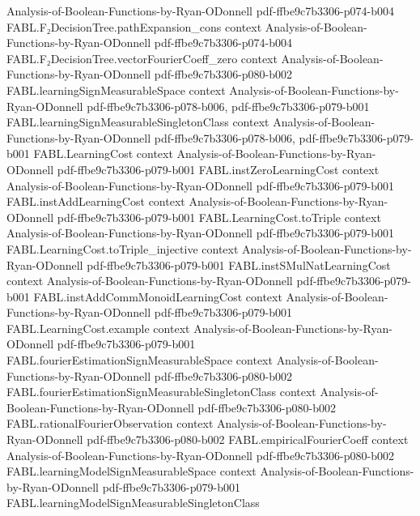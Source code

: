 \begin{theorem}
  {Analysis-of-Boolean-Functions-by-Ryan-ODonnell}
  {pdf-ffbe9c7b3306-p074-b004}
\proofstep
  {FABL.F₂DecisionTree.pathExpansion_cons}
  {context}
  {Analysis-of-Boolean-Functions-by-Ryan-ODonnell}
  {pdf-ffbe9c7b3306-p074-b004}
\proofstep
  {FABL.F₂DecisionTree.vectorFourierCoeff_zero}
  {context}
  {Analysis-of-Boolean-Functions-by-Ryan-ODonnell}
  {pdf-ffbe9c7b3306-p080-b002}
\proofstep
  {FABL.learningSignMeasurableSpace}
  {context}
  {Analysis-of-Boolean-Functions-by-Ryan-ODonnell}
  {pdf-ffbe9c7b3306-p078-b006,
    pdf-ffbe9c7b3306-p079-b001}
\proofstep
  {FABL.learningSignMeasurableSingletonClass}
  {context}
  {Analysis-of-Boolean-Functions-by-Ryan-ODonnell}
  {pdf-ffbe9c7b3306-p078-b006,
    pdf-ffbe9c7b3306-p079-b001}
\proofstep
  {FABL.LearningCost}
  {context}
  {Analysis-of-Boolean-Functions-by-Ryan-ODonnell}
  {pdf-ffbe9c7b3306-p079-b001}
\proofstep
  {FABL.instZeroLearningCost}
  {context}
  {Analysis-of-Boolean-Functions-by-Ryan-ODonnell}
  {pdf-ffbe9c7b3306-p079-b001}
\proofstep
  {FABL.instAddLearningCost}
  {context}
  {Analysis-of-Boolean-Functions-by-Ryan-ODonnell}
  {pdf-ffbe9c7b3306-p079-b001}
\proofstep
  {FABL.LearningCost.toTriple}
  {context}
  {Analysis-of-Boolean-Functions-by-Ryan-ODonnell}
  {pdf-ffbe9c7b3306-p079-b001}
\proofstep
  {FABL.LearningCost.toTriple_injective}
  {context}
  {Analysis-of-Boolean-Functions-by-Ryan-ODonnell}
  {pdf-ffbe9c7b3306-p079-b001}
\proofstep
  {FABL.instSMulNatLearningCost}
  {context}
  {Analysis-of-Boolean-Functions-by-Ryan-ODonnell}
  {pdf-ffbe9c7b3306-p079-b001}
\proofstep
  {FABL.instAddCommMonoidLearningCost}
  {context}
  {Analysis-of-Boolean-Functions-by-Ryan-ODonnell}
  {pdf-ffbe9c7b3306-p079-b001}
\proofstep
  {FABL.LearningCost.example}
  {context}
  {Analysis-of-Boolean-Functions-by-Ryan-ODonnell}
  {pdf-ffbe9c7b3306-p079-b001}
\proofstep
  {FABL.fourierEstimationSignMeasurableSpace}
  {context}
  {Analysis-of-Boolean-Functions-by-Ryan-ODonnell}
  {pdf-ffbe9c7b3306-p080-b002}
\proofstep
  {FABL.fourierEstimationSignMeasurableSingletonClass}
  {context}
  {Analysis-of-Boolean-Functions-by-Ryan-ODonnell}
  {pdf-ffbe9c7b3306-p080-b002}
\proofstep
  {FABL.rationalFourierObservation}
  {context}
  {Analysis-of-Boolean-Functions-by-Ryan-ODonnell}
  {pdf-ffbe9c7b3306-p080-b002}
\proofstep
  {FABL.empiricalFourierCoeff}
  {context}
  {Analysis-of-Boolean-Functions-by-Ryan-ODonnell}
  {pdf-ffbe9c7b3306-p080-b002}
\proofstep
  {FABL.learningModelSignMeasurableSpace}
  {context}
  {Analysis-of-Boolean-Functions-by-Ryan-ODonnell}
  {pdf-ffbe9c7b3306-p079-b001}
\proofstep
  {FABL.learningModelSignMeasurableSingletonClass}

\end{theorem}
